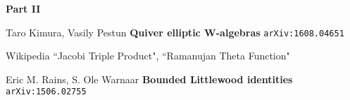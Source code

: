 \documentclass[12pt]{article}
\begin{document}
\noindent \textbf{Part II}

\selectfont \fontsize{12}{10}\selectfont

\begin{thebibliography}{}

\item Taro Kimura, Vasily Pestun \textbf{Quiver elliptic W-algebras} \texttt{arXiv:1608.04651}
\item Wikipedia ``Jacobi Triple Product", ``Ramanujan Theta Function"
\item Eric M. Rains, S. Ole Warnaar \textbf{Bounded Littlewood identities} \texttt{arXiv:1506.02755}

\end{thebibliography}
\end{document}

